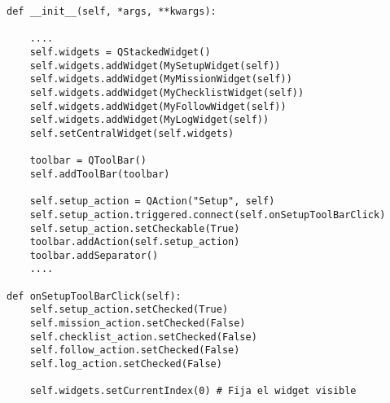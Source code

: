 \begin{verbatim}
def __init__(self, *args, **kwargs):
    
    ....
    self.widgets = QStackedWidget()
    self.widgets.addWidget(MySetupWidget(self))
    self.widgets.addWidget(MyMissionWidget(self))
    self.widgets.addWidget(MyChecklistWidget(self))
    self.widgets.addWidget(MyFollowWidget(self))
    self.widgets.addWidget(MyLogWidget(self))
    self.setCentralWidget(self.widgets)

    toolbar = QToolBar()
    self.addToolBar(toolbar)

    self.setup_action = QAction("Setup", self)
    self.setup_action.triggered.connect(self.onSetupToolBarClick)
    self.setup_action.setCheckable(True)
    toolbar.addAction(self.setup_action)
    toolbar.addSeparator()
    ....
    
def onSetupToolBarClick(self):
    self.setup_action.setChecked(True)
    self.mission_action.setChecked(False)
    self.checklist_action.setChecked(False)
    self.follow_action.setChecked(False)
    self.log_action.setChecked(False)

    self.widgets.setCurrentIndex(0) # Fija el widget visible 
    
\end{verbatim}
